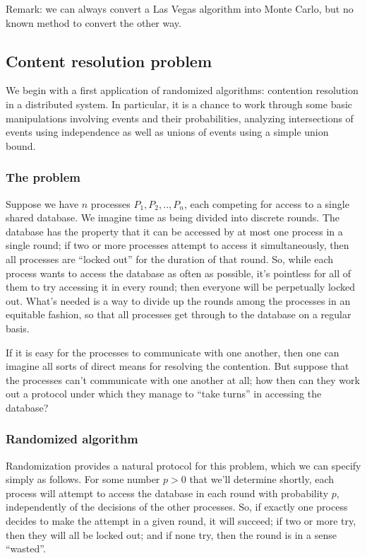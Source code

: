Remark: we can always convert a Las Vegas algorithm into Monte Carlo, but no known method to convert the other way.

\subsection{Content resolution problem}
We begin with a first application of randomized algorithms: contention resolution in a distributed system. In particular, it is a chance to work through some basic manipulations involving events and their probabilities, analyzing intersections of events using independence as well as unions of events using a simple union bound.

\subsubsection{The problem}
Suppose we have $n$ processes $P_1, P_2,.. , P_n$, each competing for access to a single shared database. We imagine time as being divided into discrete rounds. The database has the property that it can be accessed by at most one process in a single round; if two or more processes attempt to access it simultaneously, then all processes are “locked out” for the duration of that round. So, while each process wants to access the database as often as possible, it’s pointless for all of them to try accessing it in every round; then everyone will be perpetually locked out. What’s needed is a way to divide up the rounds among the processes in an equitable fashion, so that all processes get through to the database on a regular basis. 

If it is easy for the processes to communicate with one another, then one can imagine all sorts of direct means for resolving the contention. But suppose that the processes can’t communicate with one another at all; how then can they work out a protocol under which they manage to “take turns” in accessing the database?

\subsubsection{Randomized algorithm}
Randomization provides a natural protocol for this problem, which we can specify simply as follows. For some number $p > 0$ that we’ll determine shortly, each process will attempt to access the database in each round with probability $p$, independently of the decisions of the other processes. So, if exactly one process decides to make the attempt in a given round, it will succeed; if two or more try, then they will all be locked out; and if none try, then the round is in a sense “wasted”. 

